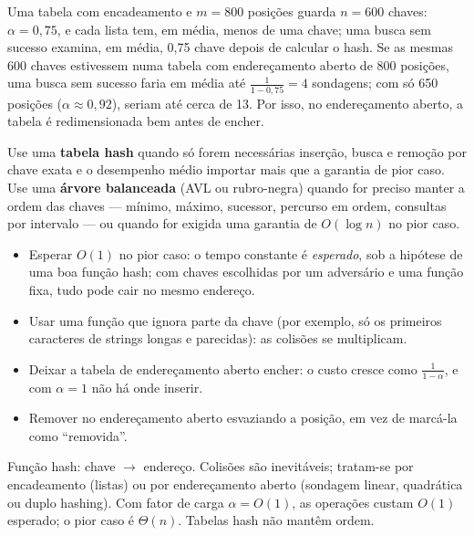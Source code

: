 \begin{exemplo}\label{ex:dimensionando}
Uma tabela com encadeamento e $m=800$ posições guarda $n=600$ chaves: $\alpha=0{,}75$, e cada lista tem, em média, menos de uma chave; uma busca sem sucesso examina, em média, 0,75 chave depois de calcular o hash. Se as mesmas 600 chaves estivessem numa tabela com endereçamento aberto de 800 posições, uma busca sem sucesso faria em média até $\frac1{1-0{,}75}=4$ sondagens; com só 650 posições ($\alpha\approx0{,}92$), seriam até cerca de 13. Por isso, no endereçamento aberto, a tabela é redimensionada bem antes de encher.
\end{exemplo}

\begin{roteiro}
Use uma \textbf{tabela hash} quando só forem necessárias inserção, busca e remoção por chave exata e o desempenho médio importar mais que a garantia de pior caso. Use uma \textbf{árvore balanceada} (AVL ou rubro-negra) quando for preciso manter a ordem das chaves --- mínimo, máximo, sucessor, percurso em ordem, consultas por intervalo --- ou quando for exigida uma garantia de $O(\log n)$ no pior caso.
\end{roteiro}

\begin{cuidado}
\begin{itemize}
  \item Esperar $O(1)$ no pior caso: o tempo constante é \emph{esperado}, sob a hipótese de uma boa função hash; com chaves escolhidas por um adversário e uma função fixa, tudo pode cair no mesmo endereço.
  \item Usar uma função que ignora parte da chave (por exemplo, só os primeiros caracteres de strings longas e parecidas): as colisões se multiplicam.
  \item Deixar a tabela de endereçamento aberto encher: o custo cresce como $\frac1{1-\alpha}$, e com $\alpha=1$ não há onde inserir.
  \item Remover no endereçamento aberto esvaziando a posição, em vez de marcá-la como ``removida''.
\end{itemize}
\end{cuidado}

\begin{chave}
Função hash: chave $\to$ endereço. Colisões são inevitáveis; tratam-se por encadeamento (listas) ou por endereçamento aberto (sondagem linear, quadrática ou duplo hashing). Com fator de carga $\alpha=O(1)$, as operações custam $O(1)$ esperado; o pior caso é $\Theta(n)$. Tabelas hash não mantêm ordem.
\end{chave}


